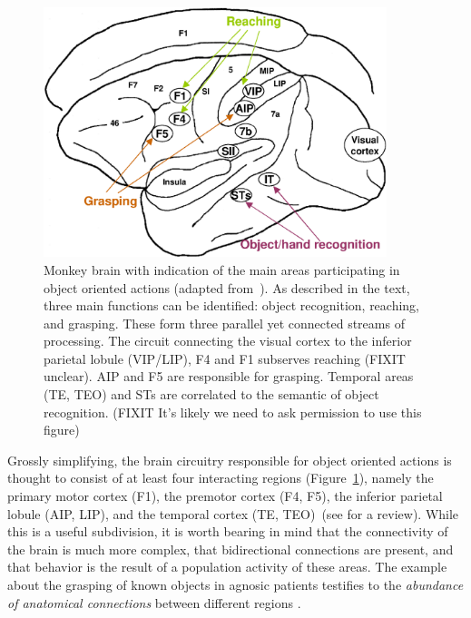 %
%
\begin{figure}[tb]
\begin{center}
\includegraphics[width=10cm]{brain-schema.eps}
\caption{ 
\label{fig:brain-schema}
%
Monkey brain with indication of the main areas participating in object
oriented actions (adapted from~\cite{fagg-arbib-1998}). As described in the
text, three main functions can be identified: object recognition, reaching,
and grasping. These form three parallel yet connected streams of 
processing. The circuit connecting the visual cortex to the inferior parietal 
lobule (VIP/LIP), F4 and F1 subserves reaching (FIXIT unclear). AIP and F5 are responsible for
grasping. Temporal areas (TE, TEO) and STs are correlated to the
semantic of object recognition.
(FIXIT It's likely we need to ask permission to use this figure)
%
}
\end{center}
\end{figure}
%
%

Grossly simplifying, the brain circuitry responsible 
for object oriented actions is thought to consist of at least four 
interacting regions (Figure~\ref{fig:brain-schema}), namely the primary motor cortex (F1), the premotor cortex (F4, F5), the 
inferior parietal lobule (AIP, LIP), and the temporal cortex 
(TE, TEO)~(see \cite{rizzolatti-fogassi-gallese-1997,fadiga00visuomotor,jeannerod97cognitive} 
for a review). 
While this is a useful subdivision, it is worth bearing in mind 
that the connectivity of the brain is much more complex, that bidirectional 
connections are present, and that behavior is the result of a 
population activity of these areas. The example about the grasping of known 
objects in agnosic patients testifies to the \emph{abundance of anatomical connections} 
between different regions \cite{jeannerod-arbib-rizzolatti-sakata-1995}.

